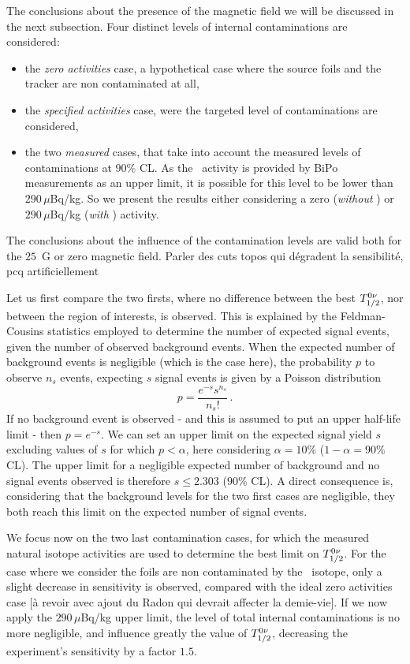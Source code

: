 The conclusions about the presence of the magnetic field we will be discussed in the next subsection.
Four distinct levels of internal contaminations are considered:
\begin{itemize}
\item the \emph{zero activities} case, a hypothetical case where the source foils and the tracker are non contaminated at all,
\item the \emph{specified activities} case, were the targeted level of contaminations are considered,
\item the two \emph{measured} cases, that take into account the measured levels of contaminations at $90\%$ CL.
  As the \Bi\ activity is provided by BiPo measurements as an upper limit, it is possible for this level to be lower than $290\,\mu$Bq/kg.
  So we present the results either considering a zero (\emph{without \Bi}) or $290\,\mu$Bq/kg (\emph{with \Bi}) activity.
\end{itemize}

The conclusions about the influence of the contamination levels are valid both for the $25$~G or zero magnetic field.
Parler des cuts topos qui dégradent la sensibilité, pcq artificiellement

Let us first compare the two firsts, where no difference between the best $T_{1/2}^{0\nu}$, nor between the region of interests, is observed.
This is explained by the Feldman-Cousins statistics employed to determine the number of expected signal events, given the number of observed background events.
When the expected number of background events is negligible (which is the case here), the probability $p$ to observe $n_{s}$ events, expecting $s$ signal events is given by a Poisson distribution
\begin{equation}
p = \frac{e^{-s}s^{n_{s}}}{n_{s}!}\,.
\end{equation}
If no background event is observed - and this is assumed to put an upper half-life limit - then $p = e^{-s}$.
We can set an upper limit on the expected signal yield $s$ excluding values of $s$ for which $p < \alpha$, here considering $\alpha = 10\%$ ($1-\alpha = 90\%$ CL).
The upper limit for a negligible expected number of background and no signal events observed is therefore $s \leq 2.303$ ($90\%$ CL).
A direct consequence is, considering that the background levels for the two first cases are negligible, they both reach this limit on the expected number of signal events.

We focus now on the two last contamination cases, for which the measured natural isotope activities are used to determine the best limit on $T_{1/2}^{0\nu}$.
For the case where we consider the foils are non contaminated by the \Bi\ isotope, only a slight decrease in sensitivity is observed, compared with the ideal zero activities case [à revoir avec ajout du Radon qui devrait affecter la demie-vie].
If we now apply the $290\,\mu$Bq/kg upper limit, the level of total internal contaminations is no more negligible, and influence greatly the value of $T_{1/2}^{0\nu}$, decreasing the experiment's sensitivity by a factor $1.5$.

